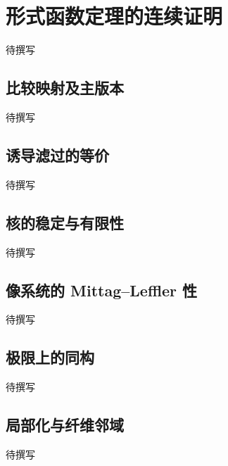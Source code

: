 
% 
% 
% 
% 
% 
% 
% 
% 
% 
% 
% 
% 
% 

\section{形式函数定理的连续证明}
\label{g5:sec:2102}

待撰写

\subsection{比较映射及主版本}
\label{g5:subsec:2102:01}
待撰写

\subsection{诱导滤过的等价}
\label{g5:subsec:2102:02}
待撰写

\subsection{核的稳定与有限性}
\label{g5:subsec:2102:03}
待撰写

\subsection{像系统的 Mittag–Leffler 性}
\label{g5:subsec:2102:04}
待撰写

\subsection{极限上的同构}
\label{g5:subsec:2102:05}
待撰写

\subsection{局部化与纤维邻域}
\label{g5:subsec:2102:06}
待撰写
